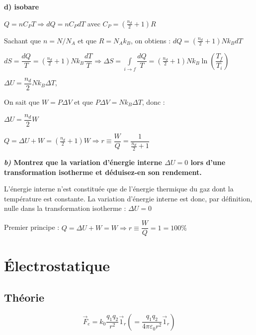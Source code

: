 \documentclass[british,french,11pt, a4paper, openany]{book}
\begin{document}
		\textbf{d) isobare}
				
		$ Q = nC_PT \Rightarrow dQ = nC_PdT$ avec $ C_P = (\frac{n_d}{2}+1)R$
				
		Sachant que $n = N/N_A$ et que $R = N_Ak_B$, on obtiens : $dQ = (\frac{n_d}{2}+1)Nk_BdT $
				
		$dS = \dfrac{dQ}{T} = (\frac{n_d}{2}+1)Nk_B\dfrac{dT}{T} \Rightarrow \Delta S = \int \limits_{i \to f} \dfrac{dQ}{T} = (\frac{n_d}{2}+1)Nk_B\ln \left(\dfrac{T_f}{T_i}\right)$
		
		\vspace{0,5cm}
		
				
		$\Delta U = \dfrac{n_d}{2}Nk_B\Delta T $,
				
		On sait que $W = P\Delta V$ et que $ P\Delta V = Nk_B\Delta T$, donc :
				
		$ \Delta U = \dfrac{n_d}{2}W$
				
		$Q = \Delta U + W = (\frac{n_d}{2}+1)W \Rightarrow r \equiv \dfrac{W}{Q} = \dfrac{1}{\frac{n_d}{2}+1}$
				
		\textbf{\textit{b)} Montrez que la variation d'énergie interne $\Delta U = 0$ lors d'une transformation isotherme et déduisez-en son rendement.}
				
		L'énergie interne n'est constituée que de l'énergie thermique du gaz dont la température est constante. La variation d'énergie interne est donc, par définition, nulle dans la transformation isotherme : $\Delta U = 0$
				
		Premier principe : $Q = \Delta U + W = W \Rightarrow r \equiv \dfrac{W}{Q} = 1 = 100\% $
				
		
		\newpage
		\section{Électrostatique}
		\subsection{Théorie}
			
		$$ \vec F_e = k_0 \dfrac{q_1 q_2}{r^2} \vec 1_r \left(= \dfrac{q_1 q_2}{4\pi \varepsilon_0 r^2} \vec 1_r \right) $$
			
\end{document}
